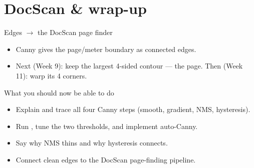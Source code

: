 \documentclass[10pt,aspectratio=169]{beamer}
\begin{document}
\section{DocScan \& wrap-up}

\begin{frame}{Edges $\rightarrow$ the DocScan page finder}
  \begin{center}
  \end{center}
  \begin{itemize}
    \item Canny gives the page/meter boundary as connected edges.
    \item Next (Week 9): keep the largest 4-sided contour — the page. Then (Week 11): warp its 4 corners.
  \end{itemize}
\end{frame}

\begin{frame}{What you should now be able to do}
  \begin{itemize}
    \item Explain and trace all four Canny steps (smooth, gradient, NMS, hysteresis).
    \item Run , tune the two thresholds, and implement auto-Canny.
    \item Say why NMS thins and why hysteresis connects.
    \item Connect clean edges to the DocScan page-finding pipeline.
  \end{itemize}
\end{frame}
\end{document}
